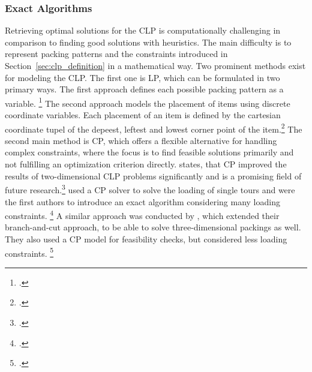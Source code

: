 \subsubsection{Exact Algorithms}
Retrieving optimal solutions for the \gls{CLP} is computationally challenging in comparison
to finding good solutions with heuristics. The main difficulty is to represent packing
patterns and the constraints introduced in Section~\ref{sec:clp_definition} in a mathematical way.
Two prominent methods exist for modeling the \gls{CLP}. The first one is \gls{LP}, which can be
formulated in two primary ways. The first approach defines each possible packing pattern as
a variable. \footcite[cf.][p. 29f]{zhu_prototype_2012} The second approach models
the placement of items using discrete coordinate variables. Each placement of an item
is defined by the cartesian coordinate tupel of the depeest, leftest and lowest corner point of
the item.\footcites(cf.)()[][pp. 649--653]{junqueira_optimization_2013}[][pp. 4--8]{moura_integrated_2009}
The second main method is \gls{CP}, which offers a flexible alternative for handling
complex constraints, where the focus is to find feasible solutions primarily and
not fulfilling an optimization criterion directly. \textcite{iori_exact_2021} states, that
\gls{CP} improved the results of two-dimensional \gls{CLP} problems significantly and is a promising
field of future research.\footcite[cf.][p. 23]{iori_exact_2021} \cite{tamke_branch-and-cut_2024} used a \gls{CP} solver
to solve the loading of single tours and were the first authors to introduce an exact algorithm
considering many loading constraints. \footcite[cf.][pp. 7--11]{tamke_branch-and-cut_2024}
A similar approach was conducted by \cite{hokama_branch-and-cut_2016}, which extended their
branch-and-cut approach, to be able to solve three-dimensional packings as well.
They also used a \gls{CP} model for feasibility checks, but considered less loading constraints. \footcite[cf.][]{hokama_branch-and-cut_2016}

\parbreak

